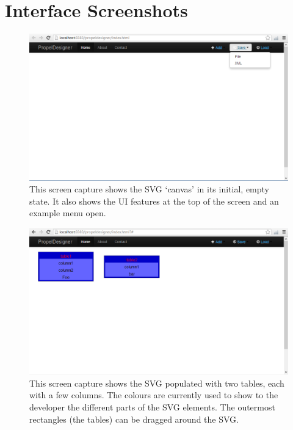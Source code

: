 \chapter{Interface Screenshots}

\begin{figure}[h!]
	\centering
	\includegraphics[width=15cm]{Images/blank_schema}
	\caption{This screen capture shows the SVG `canvas' in its initial, empty state. It also shows the UI features at the top of the screen and an example menu open.}
\end{figure}

\begin{figure}[h!]
	\centering
	\includegraphics[width=15cm]{Images/populated_schema}
	\caption{This screen capture shows the SVG populated with two tables, each with a few columns. The colours are currently used to show to the developer the different parts of the SVG elements. The outermost rectangles (the tables) can be dragged around the SVG.}
\end{figure}

